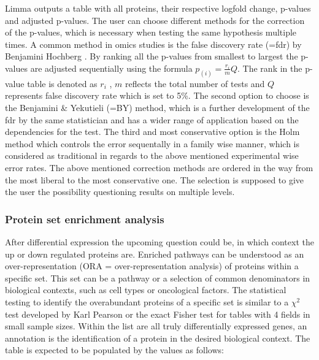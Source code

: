 \documentclass[
  11pt,
]{article}
\begin{document}
Limma outputs a table with all proteins, their respective logfold
change, p-values and adjusted p-values. The user can choose different
methods for the correction of the p-values, which is necessary when
testing the same hypothesis multiple times. A common method in omics
studies is the false discovery rate (=fdr) by Benjamini Hochberg
\citep{Benjamini1995}. By ranking all the p-values from smallest to
largest the p-values are adjusted sequentially using the formula
\(p_(i) = \frac{r_i}{m} Q\). The rank in the p-value table is denoted as
\(r_i\) , \(m\) reflects the total number of tests and \(Q\) represents
false discovery rate which is set to 5\%. The second option to choose is
the Benjamini \& Yekutieli (=BY) \citep{Benjamini2001}method, which is a
further development of the fdr by the same statistician and has a wider
range of application based on the dependencies for the test. The third
and most conservative option is the Holm method \citep{Holm1979} which
controls the error sequentally in a family wise manner, which is
considered as traditional in regards to the above mentioned experimental
wise error rates. The above mentioned correction methods are ordered in
the way from the most liberal to the most conservative one. The
selection is supposed to give the user the possibility questioning
results on multiple levels.

\hypertarget{protein-set-enrichment-analysis}{%
\subsubsection{Protein set enrichment
analysis}\label{protein-set-enrichment-analysis}}

After differential expression the upcoming question could be, in which
context the up or down regulated proteins are. Enriched pathways can be
understood as an over-representation (ORA = over-representation
analysis) of proteins within a specific set. This set can be a pathway
or a selection of common denominators in biological contexts, such as
cell types or oncological factors. The statistical testing to identify
the overabundant proteins of a specific set is similar to a \(\chi^2\)
test developed by Karl Pearson \citep{Pearson1900} or the exact Fisher
test \citep{Sprent2011} for tables with 4 fields in small sample sizes.
Within the list are all truly differentially expressed genes, an
annotation is the identification of a protein in the desired biological
context. The table is expected to be populated by the values as follows:
\end{document}

